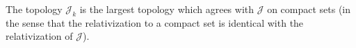 The topology $\mathcal{J}_k$ is the largest topology which agrees with $\mathcal{J}$ on compact sets (in the sense that the relativization to a compact set is identical with the relativization of $\mathcal{J}$).
